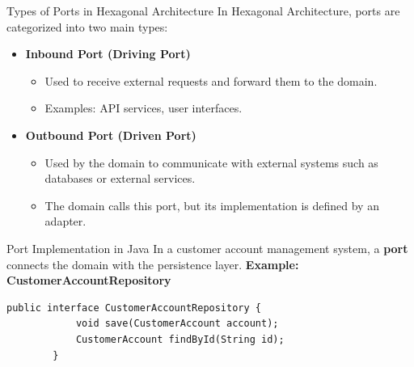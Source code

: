 \documentclass[aspectratio=169, table]{beamer}
\begin{document}
\begin{frame}[fragile]{Types of Ports in Hexagonal Architecture}
	\vspace{20pt}
	In Hexagonal Architecture, ports are categorized into two main types:
	\begin{itemize}
		\item \textbf{Inbound Port (Driving Port)}  
		\begin{itemize}
			\item Used to receive external requests and forward them to the domain.
			\item Examples: API services, user interfaces.
		\end{itemize}
		\item \textbf{Outbound Port (Driven Port)}  
		\begin{itemize}
			\item Used by the domain to communicate with external systems such as databases or external services.
			\item The domain calls this port, but its implementation is defined by an adapter.
		\end{itemize}
	\end{itemize}
\end{frame}

\begin{frame}[fragile]{Port Implementation in Java}
	\vspace{20pt}
	In a customer account management system, a \textbf{port} connects the domain with the persistence layer.  
	\textbf{Example: CustomerAccountRepository}
	
	\begin{lstlisting}[style=JavaStyle, caption=CustomerAccountRepository Port]
		public interface CustomerAccountRepository {
			void save(CustomerAccount account);
			CustomerAccount findById(String id);
		}
	\end{lstlisting}
\end{frame}
\end{document}
